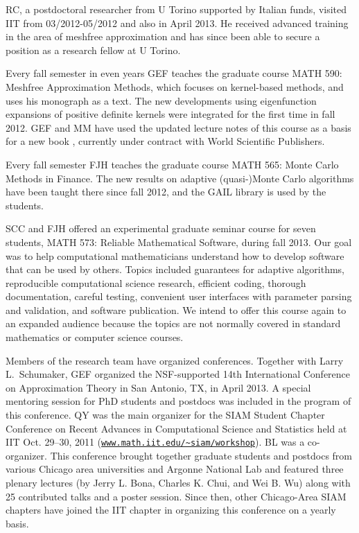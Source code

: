 \documentclass[11pt]{NSFamsart}
\begin{document}
RC, a postdoctoral researcher from U Torino supported by Italian funds, visited IIT from 03/2012-05/2012 and also in April 2013. He received advanced training in the area of meshfree approximation and has since been able to secure a position as a research fellow at U Torino.

Every fall semester in even years GEF teaches the graduate course MATH 590: Meshfree Approximation Methods, which focuses on kernel-based methods, and uses his monograph \citep{Fas07a} as a text. The new developments using eigenfunction expansions of positive definite kernels were integrated for the first time in fall 2012. GEF and MM have used the updated lecture notes of this course as a basis for a new book \citep{FMcC15}, currently under contract with World Scientific Publishers.

Every fall semester FJH teaches the graduate course MATH 565: Monte Carlo Methods in Finance.  The new results on adaptive (quasi-)Monte Carlo algorithms have been taught there since fall 2012, and the GAIL library is used by the students.

SCC and FJH offered an experimental graduate seminar course for seven students, MATH 573: Reliable Mathematical Software, during fall 2013. Our goal was to help computational mathematicians understand how to develop software that can be used by others.  Topics included guarantees for adaptive algorithms, reproducible computational science research, efficient coding, thorough documentation, careful testing, convenient user interfaces with parameter parsing and validation, and software publication.  We intend to offer this course again to an expanded audience because the topics are not normally covered in standard mathematics or computer science courses.

Members of the research team have organized conferences. Together with Larry L.~Schumaker, GEF organized the NSF-supported 14th International Conference on Approximation Theory in San Antonio, TX, in April 2013. A special mentoring session for PhD students and postdocs was included in the program of this conference. QY was the main organizer for the SIAM Student Chapter Conference on Recent Advances in Computational Science and Statistics held at IIT Oct. 29--30, 2011 (\href{http://www.math.iit.edu/~siam/workshop/}{\nolinkurl{www.math.iit.edu/~siam/workshop}}). BL was a co-organizer. This conference brought together graduate students and postdocs from various Chicago area universities and Argonne National Lab and featured three plenary lectures (by Jerry L. Bona, Charles K. Chui, and Wei B. Wu) along with 25 contributed talks and a poster session. Since then, other Chicago-Area SIAM chapters have joined the IIT chapter in organizing this conference on a yearly basis.
\end{document}
